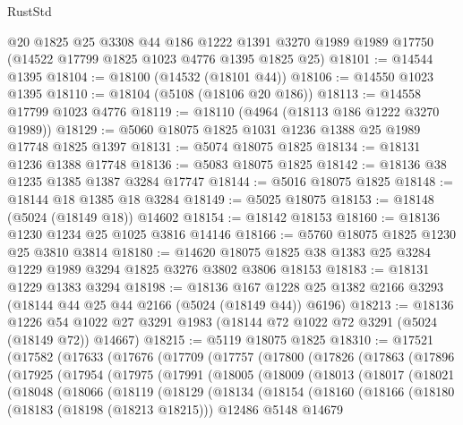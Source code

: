 \begin{lexlean}{RustStd}
\begin{coremodule}
    @20
    @1825
    @25
    @3308
    @44
    @186
    @1222
    @1391
    @3270
    @1989
    @1989
    @17750
    (@14522 @17799 @1825 @1023 @4776 @1395 @1825 @25)
@18101 := @14544 @1395
@18104 := @18100 (@14532 (@18101 @44))
@18106 := @14550 @1023 @1395
@18110 := @18104 (@5108 (@18106 @20 @186))
@18113 := @14558 @17799 @1023 @4776
@18119 := @18110 (@4964 (@18113 @186 @1222 @3270 @1989))
@18129 := @5060 @18075 @1825 @1031 @1236 @1388 @25 @1989 @17748 @1825 @1397
@18131 := @5074 @18075 @1825
@18134 := @18131 @1236 @1388 @17748
@18136 := @5083 @18075 @1825
@18142 := @18136 @38 @1235 @1385 @1387 @3284 @17747
@18144 := @5016 @18075 @1825
@18148 := @18144 @18 @1385 @18 @3284
@18149 := @5025 @18075
@18153 := @18148 (@5024 (@18149 @18)) @14602
@18154 := @18142 @18153
@18160 := @18136 @1230 @1234 @25 @1025 @3816 @14146
@18166 := @5760 @18075 @1825 @1230 @25 @3810 @3814
@18180 := @14620 @18075 @1825 @38 @1383 @25 @3284 @1229 @1989 @3294 @1825 @3276 @3802 @3806 @18153
@18183 := @18131 @1229 @1383 @3294
@18198 := @18136
    @167
    @1228
    @25
    @1382
    @2166
    @3293
    (@18144 @44 @25 @44 @2166 (@5024 (@18149 @44)) @6196)
@18213 := @18136
    @1226
    @54
    @1022
    @27
    @3291
    @1983
    (@18144 @72 @1022 @72 @3291 (@5024 (@18149 @72)) @14667)
@18215 := @5119 @18075 @1825
@18310 := @17521
    (@17582
      (@17633
        (@17676
          (@17709
            (@17757
              (@17800
                (@17826
                  (@17863
                    (@17896
                      (@17925
                        (@17954
                          (@17975
                            (@17991
                              (@18005
                                (@18009
                                  (@18013
                                    (@18017
                                      (@18021
                                        (@18048
                                          (@18066
                                            (@18119
                                              (@18129
                                                (@18134
                                                  (@18154
                                                    (@18160
                                                      (@18166
                                                        (@18180
                                                          (@18183 (@18198 (@18213 @18215)))
                                                          @12486
                                                          @5148
                                                          @14679

\end{coremodule}
\end{lexlean}
